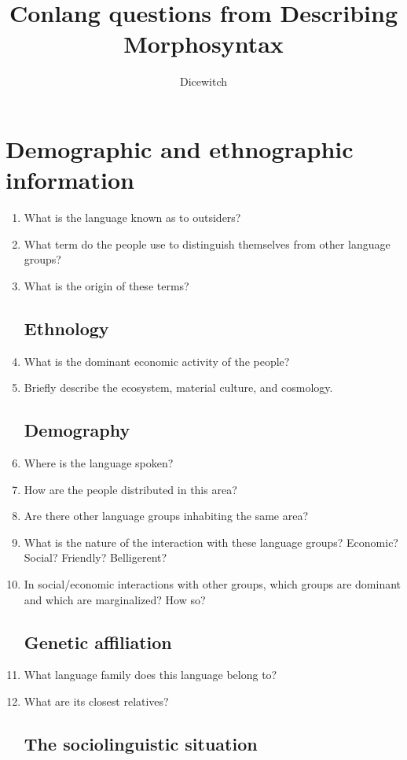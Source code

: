 \documentclass[twocolumn]{scrartcl}
\title{Conlang questions from Describing Morphosyntax}
\author{Dicewitch}
\begin{document}
\maketitle
\onecolumn
\tableofcontents
\pagebreak
\twocolumn
\section{Demographic and ethnographic information}
\begin{enumerate}
\subsection{Name of the language}
\item What is the language known as to outsiders?
\item What term do the people use to distinguish themselves from other language groups?
\item What is the origin of these terms?
\subsection{Ethnology}
\item What is the dominant economic activity of the people?
\item Briefly describe the ecosystem, material culture, and cosmology.
\subsection{Demography}
\item Where is the language spoken?
\item How are the people distributed in this area?
\item Are there other language groups inhabiting the same area?
\item What is the nature of the interaction with these language groups? Economic? Social? Friendly? Belligerent?

\item In social/economic interactions with other groups, which groups are dominant and which are marginalized?  How so?
\subsection{Genetic affiliation}
\item What language family does this language belong to?
\item What are its closest relatives?
\subsection{The sociolinguistic situation}

\end{enumerate}
\end{document}
